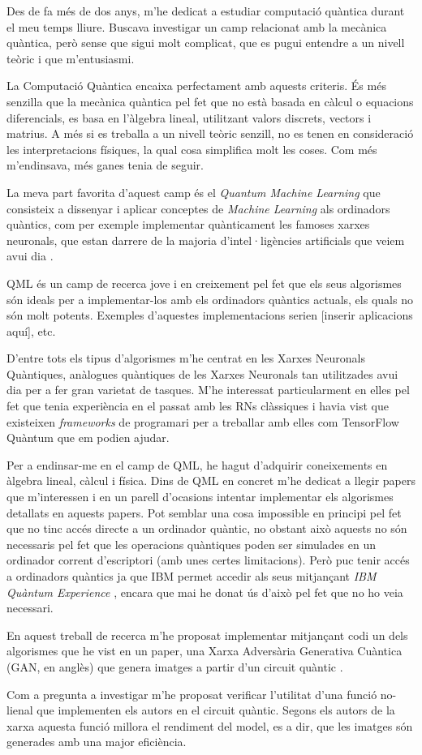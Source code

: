 Des de fa més de dos anys, m'he dedicat a estudiar computació quàntica durant el meu temps lliure. Buscava investigar un camp relacionat amb la mecànica quàntica, però sense que sigui molt complicat, que es pugui entendre a un nivell teòric i que m'entusiasmi.

La Computació Quàntica encaixa perfectament amb aquests criteris. És més senzilla que la mecànica quàntica pel fet que no està basada en càlcul o equacions diferencials, es basa en l'àlgebra lineal, utilitzant valors discrets, vectors i matrius. A més si es treballa a un nivell teòric senzill, no es tenen en consideració les interpretacions físiques, la qual cosa simplifica molt les coses. Com més m'endinsava, més ganes tenia de seguir.

La meva part favorita d'aquest camp és el \textit{Quantum Machine Learning} que consisteix a dissenyar i aplicar conceptes de \textit{Machine Learning} als ordinadors quàntics, com per exemple implementar quànticament les famoses xarxes neuronals, que estan darrere de la majoria d'intel·ligències artificials que veiem avui dia \cite{schuld:2014}.

QML és un camp de recerca jove i en creixement pel fet que els seus algorismes són ideals per a implementar-los amb els ordinadors quàntics actuals, els quals no són molt potents. Exemples d'aquestes implementacions serien [inserir aplicacions aquí], etc.

D'entre tots els tipus d'algorismes m'he centrat en les Xarxes Neuronals Quàntiques, anàlogues quàntiques de les Xarxes Neuronals tan utilitzades avui dia per a fer gran varietat de tasques. M'he interessat particularment en elles pel fet que tenia experiència en el passat amb les RNs clàssiques i havia vist que existeixen \textit{frameworks} de programari per a treballar amb elles com TensorFlow Quàntum \cite{tfq} que em podien ajudar.

Per a endinsar-me en el camp de QML, he hagut d'adquirir coneixements en àlgebra lineal, càlcul i física. Dins de QML en concret m'he dedicat a llegir papers que m'interessen i en un parell d'ocasions intentar implementar els algorismes detallats en aquests papers. Pot semblar una cosa impossible en principi pel fet que no tinc accés directe a un ordinador quàntic, no obstant això aquests no són necessaris pel fet que les operacions quàntiques poden ser simulades en un ordinador corrent d'escriptori (amb unes certes limitacions). Però puc tenir accés a ordinadors quàntics ja que IBM permet accedir als seus mitjançant \textit{IBM Quàntum Experience} \cite{IBM_Q}, encara que mai he donat ús d'això pel fet que no ho veia necessari.

En aquest treball de recerca m'he proposat implementar mitjançant codi un dels algorismes que he vist en un paper, una Xarxa Adversària Generativa Cuàntica (GAN, en anglès) \cite{GAN2014} que genera imatges a partir d'un circuit quàntic \cite{QGAN_exp}.

Com a pregunta a investigar m'he proposat verificar l'utilitat d'una funció no-lienal que implementen els autors en el circuit quàntic. Segons els autors de la xarxa aquesta funció millora el rendiment del model, es a dir, que les imatges són generades amb una major eficiència. 


